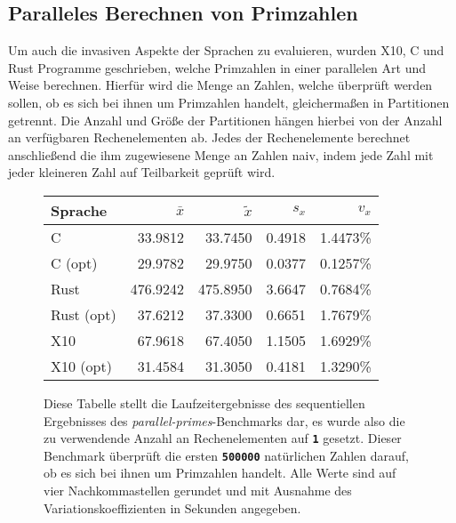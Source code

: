 \FloatBarrier

\subsection{Paralleles Berechnen von Primzahlen}

Um auch die invasiven Aspekte der Sprachen zu evaluieren, wurden X10, C und Rust Programme geschrieben,
welche Primzahlen in einer parallelen Art und Weise berechnen.
Hierfür wird die Menge an Zahlen, welche überprüft werden sollen,
ob es sich bei ihnen um Primzahlen handelt, gleichermaßen in Partitionen getrennt.
Die Anzahl und Größe der Partitionen hängen hierbei von der Anzahl an verfügbaren Rechenelementen ab.
Jedes der Rechenelemente berechnet anschließend die ihm zugewiesene Menge an Zahlen naiv,
indem jede Zahl mit jeder kleineren Zahl auf Teilbarkeit geprüft wird.

\begin{figure}[hb]
	\begin{center}
		\begin{tabular}{lrrrr}
			\toprule
			Sprache & $\bar{x}$ & $\tilde{x}$ & $s_x$ & $v_x$ \\
			\midrule
			C          &  33.9812 &  33.7450 & 0.4918 & 1.4473\% \\
			C (opt)    &  29.9782 &  29.9750 & 0.0377 & 0.1257\% \\
			Rust       & 476.9242 & 475.8950 & 3.6647 & 0.7684\% \\
			Rust (opt) &  37.6212 &  37.3300 & 0.6651 & 1.7679\% \\
			X10        &  67.9618 &  67.4050 & 1.1505 & 1.6929\% \\
			X10 (opt)  &  31.4584 &  31.3050 & 0.4181 & 1.3290\% \\
			\bottomrule
		\end{tabular}
	\end{center}
	\caption{
		Diese Tabelle stellt die Laufzeitergebnisse des sequentiellen Ergebnisses des
		\textit{parallel-primes}-Benchmarks dar,
		es wurde also die zu verwendende Anzahl an Rechenelementen auf \texttt{\textsc{\textbf{1}}} gesetzt.
		Dieser Benchmark überprüft die ersten \texttt{\textsc{\textbf{500000}}} natürlichen Zahlen darauf,
		ob es sich bei ihnen um Primzahlen handelt.
		Alle Werte sind auf vier Nachkommastellen gerundet und mit Ausnahme des Variationskoeffizienten
		in Sekunden angegeben.
	}
	\label{fig:primes_parallel_one_table}
\end{figure}

